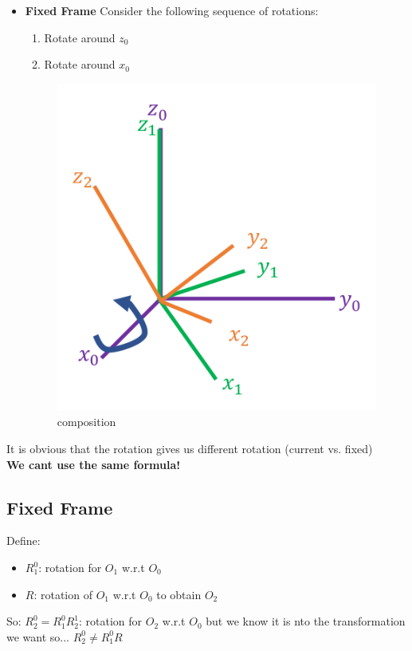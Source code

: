 \documentclass{article}
\begin{document}
\begin{itemize}
    \item \textbf{Fixed Frame} Consider the following sequence of rotations:
    \begin{enumerate}
        \item Rotate around $z_0$
        \item Rotate around $x_0$
    \end{enumerate}
    \begin{figure}[h!]
    \centering
    \includegraphics[scale=1.5]{fixedFrame.png}
    \caption{composition}
    \label{fig:sr}
    \end{figure}
\end{itemize}
It is obvious that the rotation gives us different rotation (current vs. fixed)\\
\textbf{We cant use the same formula!}

\subsection{Fixed Frame}
Define:
\begin{itemize}
    \item $R^{0}_1$: rotation for $O_1$ w.r.t $O_0$
    \item $R$: rotation of $O_1$ w.r.t $O_0$ to obtain $O_2$
\end{itemize}
So: $R^{0}_2 = R^{0}_1 R^{1}_2$: rotation for $O_2$ w.r.t $O_0$ but we know it is nto the transformation we want so... $R^{0}_2 \ne R^{0}_1 R$
\end{document}
